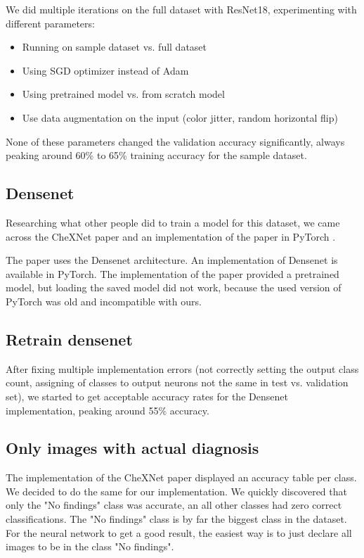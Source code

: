 We did multiple iterations on the full dataset with ResNet18, experimenting with different parameters:
\begin{itemize}
    \item Running on sample dataset vs. full dataset
    \item Using SGD optimizer instead of Adam
    \item Using pretrained model vs. from scratch model
    \item Use data augmentation on the input (color jitter, random horizontal flip)
\end{itemize}

None of these parameters changed the validation accuracy significantly, always peaking around 60\% to 65\% training accuracy for the sample dataset.

\subsection{Densenet}

Researching what other people did to train a model for this dataset, we came across the CheXNet \cite{rajpurkar2017chexnet} paper and an implementation of the paper in PyTorch \cite{chexnetpytorch}.

The paper uses the Densenet \cite{huang2017densely} architecture. An implementation of Densenet is available in PyTorch. The implementation of the paper provided a pretrained model, but loading the saved model did not work, because the used version of PyTorch was old and incompatible with ours.

\subsection{Retrain densenet}

After fixing multiple implementation errors (not correctly setting the output class count, assigning of classes to output neurons not the same in test vs. validation set), we started to get acceptable accuracy rates for the Densenet implementation, peaking around 55\% accuracy.

\subsection{Only images with actual diagnosis}
The implementation of the CheXNet paper displayed an accuracy table per class. We decided to do the same for our implementation. We quickly discovered that only the "No findings" class was accurate, an all other classes had zero correct classifications. The "No findings" class is by far the biggest class in the dataset. For the neural network to get a good result, the easiest way is to just declare all images to be in the class "No findings".

